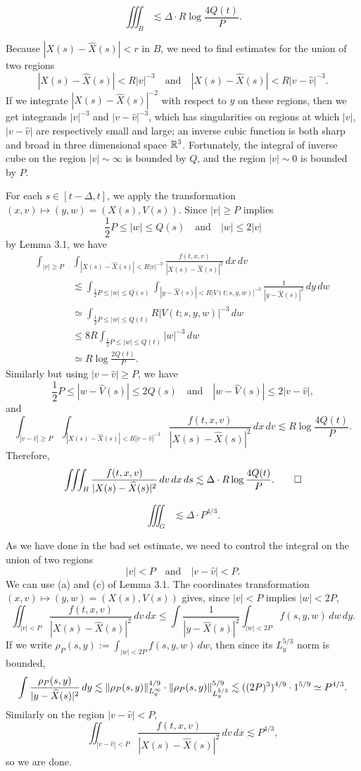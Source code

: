 \documentclass[12pt]{article}
\begin{document}
\begin{prop}
\[\iiint_B\lesssim\Delta\cdot R\log\frac{4Q(t)}P.\]
\end{prop}
\begin{pf}
Because $|X(s)-\hat X(s)|<r$ in $B$, we need to find estimates for the union of two regions
\[|X(s)-\hat X(s)|<R|v|^{-3}\quad\text{and}\quad|X(s)-\hat X(s)|<R|v-\hat v|^{-3}.\]
If we integrate $|X(s)-\hat X(s)|^{-2}$ with respect to $y$ on these regions, then we get integrands $|v|^{-3}$ and $|v-\hat v|^{-3}$, which has singularities on regions at which $|v|$, $|v-\hat v|$ are respectively small and large; an inverse cubic function is both sharp and broad in three dimensional space $\R^3$.
Fortunately, the integral of inverse cube on the region $|v|\sim\infty$ is bounded by $Q$, and the region $|v|\sim0$ is bounded by $P$.

For each $s\in[t-\Delta,t]$, we apply the transformation $(x,v)\mapsto(y,w)=(X(s),V(s))$.
Since $|v|\ge P$ implies
\[\frac12P\le|w|\le Q(s)\quad\text{and}\quad|w|\le2|v|\]
by Lemma 3.1, we have
\begin{align*}
\int_{|v|\ge P}&\int_{|X(s)-\hat X(s)|<R|v|^{-3}}\frac{f(t,x,v)}{|X(s)-\hat X(s)|^2}\,dx\,dv\\
&\lesssim\int_{\frac12P\le|w|\le Q(s)}\int_{|y-\hat X(s)|<R|V(t;s,y,w)|^{-3}}\frac1{|y-\hat X(s)|^2}\,dy\,dw\\
&\simeq\int_{\frac12P\le|w|\le Q(t)}R|V(t;s,y,w)|^{-3}\,dw\\
&\le8R\int_{\frac12P\le|w|\le Q(t)}|w|^{-3}\,dw\\
&\simeq R\log\frac{2Q(t)}P.
\end{align*}
Similarly but using $|v-\hat v|\ge P$, we have
\[\frac12P\le|w-\hat V(s)|\le 2Q(s)\quad\text{and}\quad|w-\hat V(s)|\le2|v-\hat v|,\]
and
\[\int_{|v-\hat v|\ge P}\int_{|X(s)-\hat X(s)|<R|v-\hat v|^{-3}}\frac{f(t,x,v)}{|X(s)-\hat X(s)|^2}\,dx\,dv\lesssim R\log\frac{4Q(t)}P.\]
Therefore,
\[\iiint_B\frac{f(t,x,v)}{|X(s)-\hat X(s)|^2}\,dv\,dx\,ds\lesssim\Delta\cdot R\log\frac{4Q(t)}P.\qedhere\]
\end{pf}


\begin{prop}
\[\iiint_G\lesssim\Delta\cdot P^{4/3}.\]
\end{prop}
\begin{pf}
As we have done in the bad set estimate, we need to control the integral on the union of two regions
\[|v|<P\quad\text{and}\quad|v-\hat v|<P.\]
We can use (a) and (c) of Lemma 3.1.
The coordinates transformation $(x,v)\mapsto(y,w)=(X(s),V(s))$ gives, since $|v|<P$ implies $|w|<2P$,
\[\iint_{|v|<P}\frac{f(t,x,v)}{|X(s)-\hat X(s)|^2}\,dv\,dx
\le\int\frac1{|y-\hat X(s)|^2}\int_{|w|<2P}f(s,y,w)\,dw\,dy.\]
If we write $\rho_P(s,y):=\int_{|w|<2P}f(s,y,w)\,dw$, then since its $L_y^{5/3}$ norm is bounded,
\[\int\frac{\rho_P(s,y)}{|y-\hat X(s)|^2}\,dy
\lesssim\|\rho_P(s,y)\|_{L_y^\infty}^{4/9}\cdot\|\rho_P(s,y)\|_{L_y^{5/3}}^{5/9}\\
\lesssim((2P)^3)^{4/9}\cdot1^{5/9}\simeq P^{4/3}.\]
Similarly on the region $|v-\hat v|<P$,
\[\iint_{|v-\hat v|<P}\frac{f(t,x,v)}{|X(s)-\hat X(s)|^2}\,dv\,dx\lesssim P^{4/3},\]
so we are done.
\end{pf}
\end{document}
